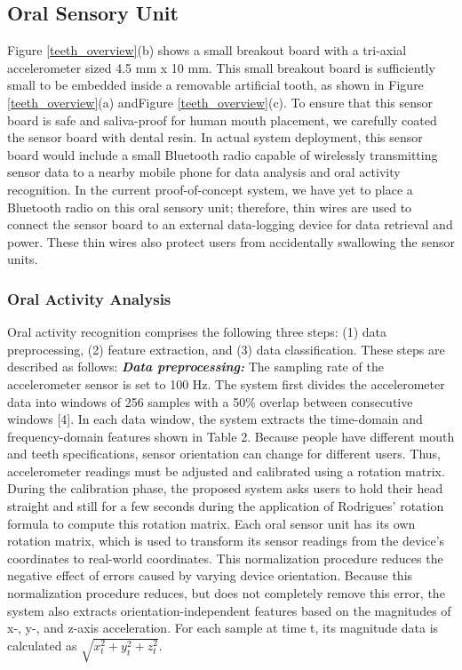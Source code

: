 \subsection{Oral Sensory Unit}
Figure \ref{teeth_overview}(b) shows a small breakout board with a tri-axial accelerometer sized 4.5 mm x 10 mm. This small breakout board is sufficiently small to be embedded inside a removable artificial tooth, as shown in Figure \ref{teeth_overview}(a) andFigure \ref{teeth_overview}(c). To ensure that this sensor board is safe and saliva-proof for human mouth placement, we carefully coated the sensor board with dental resin. In actual system deployment, this sensor board would include a small Bluetooth radio capable of wirelessly transmitting sensor data to a nearby mobile phone for data analysis and oral activity recognition. In the current proof-of-concept system, we have yet to place a Bluetooth radio on this oral sensory unit; therefore, thin wires are used to connect the sensor board to an external data-logging device for data retrieval and power. These thin wires also protect users from accidentally swallowing the sensor units.

\subsubsection{Oral Activity Analysis}
Oral activity recognition comprises the following three steps: (1) data preprocessing, (2) feature extraction, and (3) data classification. These steps are described as follows: 
\vspace{15pt}
\newline 
\textsl{\textbf{Data preprocessing:}}
\newline
The sampling rate of the accelerometer sensor is set to 100 Hz. The system first divides the accelerometer data into windows of 256 samples with a 50\% overlap between consecutive windows [4]. In each data window, the system extracts the time-domain and frequency-domain features shown in Table 2. 
Because people have different mouth and teeth specifications, sensor orientation can change for different users. Thus, accelerometer readings must be adjusted and calibrated using a rotation matrix. During the calibration phase, the proposed system asks users to hold their head straight and still for a few seconds during the application of Rodrigues' rotation formula to compute this rotation matrix. Each oral sensor unit has its own rotation matrix, which is used to transform its sensor readings from the device's coordinates to real-world coordinates. This normalization procedure reduces the negative effect of errors caused by varying device orientation. Because this normalization procedure reduces, but does not completely remove this error, the system also extracts orientation-independent features based on the magnitudes of x-, y-, and z-axis acceleration. For each sample at time t, its magnitude data is calculated as $\sqrt{x_{t}^{2}+y_{t}^{2}+z_{t}^{2}}$.


